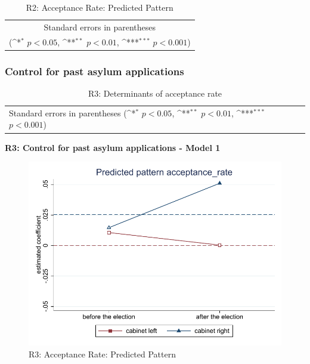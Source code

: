 \documentclass[10pt,a4paper]{scrartcl}
\begin{document}
\begin{table}[!ht]\centering
	\footnotesize
	\renewcommand{\arraystretch}{1.2}
	\def\sym#1{\ifmmode^{#1}\else\(^{#1}\)\fi}
	\caption{R2: Acceptance Rate: Predicted Pattern}
	\begin{tabular}{l*{2}{c}}
		\hline\hline
		
		\hline\hline
		\multicolumn{3}{c}{\footnotesize Standard errors in parentheses} \\
		\multicolumn{3}{c}{\footnotesize (\sym{*} \(p<0.05\), \sym{**} \(p<0.01\), \sym{***} \(p<0.001\))}\\
	\end{tabular}
\end{table}




\clearpage
\FloatBarrier
\subsubsection{Control for past asylum applications}
\begin{table}[!ht]\centering
	\renewcommand{\arraystretch}{1.25}
	\small
	\def\sym#1{\ifmmode^{#1}\else\(^{#1}\)\fi}
	\caption{R3: Determinants of acceptance rate}
	\begin{tabular}{l*{3}{c}}
		\hline\hline
		
		\hline\hline
		\multicolumn{4}{l}{\footnotesize Standard errors in parentheses (\sym{*} \(p<0.05\), \sym{**} \(p<0.01\), \sym{***} \(p<0.001\))}\\
	\end{tabular}
\end{table}

\clearpage
\textbf{R3: Control for past asylum applications - Model 1}
\begin{figure}[!ht]
	\centering
	\includegraphics[width=1\textwidth]{figures_edited/acceptance_rate_graph1_R3.pdf}
	\caption{R3: Acceptance Rate: Predicted Pattern}
\end{figure}
\end{document}
